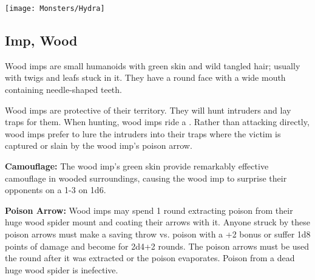 \begin{multicols*}{2}
\texttt{[image: Monsters/Hydra]}

\subsection{Imp, Wood}

Wood imps are small humanoids with green skin and wild tangled hair; usually with twigs and leafs stuck in it. They have a round face with a wide mouth containing needle-shaped teeth.

Wood imps are protective of their territory. They will hunt intruders and lay traps for them. When hunting, wood imps ride a . Rather than attacking directly, wood imps prefer to lure the intruders into their traps where the victim is captured or slain by the wood imp's poison arrow.

\textbf{Camouflage:} The wood imp's green skin provide remarkably effective camouflage in wooded surroundings, causing the wood imp to surprise their opponents on a 1-3 on 1d6.

\textbf{Poison Arrow:} Wood imps may spend 1 round extracting poison from their huge wood spider mount and coating their arrows with it. Anyone struck by these poison arrows must make a saving throw vs. poison with a +2 bonus or suffer 1d8 points of damage and become  for 2d4+2 rounds. The poison arrows must be used the round after it was extracted or the poison evaporates. Poison from a dead huge wood spider is inefective.


\end{multicols*}

